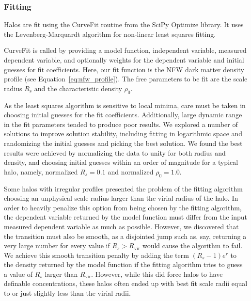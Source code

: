 \subsubsection{Fitting}
\label{subsubsec:analysis--profile_fitting--fitting}


Halos are fit using the CurveFit routine from the SciPy Optimize library.  It uses the Levenberg-Marquardt algorithm \citep{1963SIAM...11...431} for non-linear least squares fitting.

CurveFit is called by providing a model function, independent variable, measured dependent variable, and optionally weights for the dependent variable and initial guesses for fit coefficients.  Here, our fit function is the NFW dark matter density profile (see Equation~\ref{eq:nfw_profile}).  The free parameters to be fit are the scale radius $R_{s}$ and the characteristic density $\rho_{0}$.

As the least squares algorithm is sensitive to local minima, care must be taken in choosing initial guesses for the fit coefficients.  Additionally, large dynamic range in the fit parameters tended to produce poor results.  We explored a number of solutions to improve solution stability, including fitting in logarithmic space and randomizing the initial guesses and picking the best solution.  We found the best results were achieved by normalizing the data to unity for both radius and density, and choosing initial guesses within an order of magnitude for a typical halo, namely, normalized $R_{s} = 0.1$ and normalized $\rho_{0} = 1.0$.

Some halos with irregular profiles presented the problem of the fitting algorithm choosing an unphysical scale radius larger than the virial radius of the halo.  In order to heavily penalize this option from being chosen by the fitting algorithm, the dependent variable returned by the model function must differ from the input measured dependent variable as much as possible.  However, we discovered that the transition must also be smooth, as a disjointed jump such as, say, returning a very large number for every value if $R_{s} > R_{\mathrm{vir}}$ would cause the algorithm to fail.  We achieve this smooth transition penalty by adding the term $(R_{s} - 1) e^{r}$ to the density returned by the model function if the fitting algorithm tries to guess a value of $R_{s}$ larger than $R_{\mathrm{vir}}$.  However, while this did force halos to have definable concentrations, these halos often ended up with best fit scale radii equal to or just slightly less than the virial radii.

